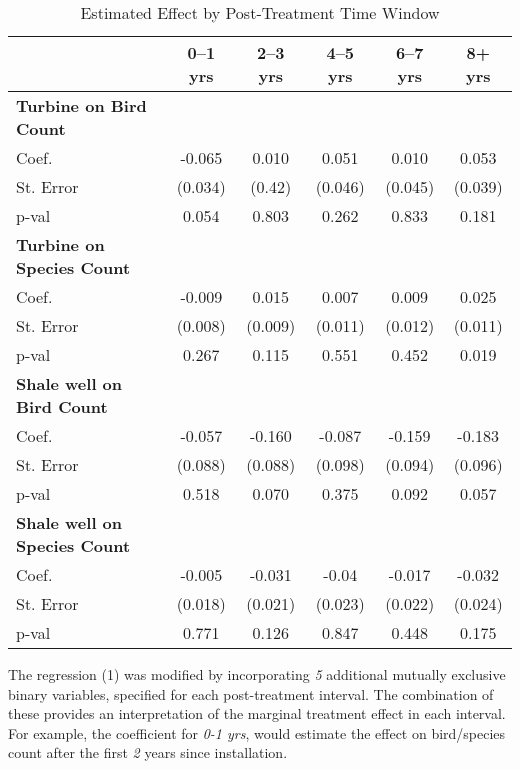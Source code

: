 \documentclass{article}
\begin{document}
\begin{table}[htbp]
\centering
\caption{Estimated Effect by Post-Treatment Time Window}
\label{tab:window_effects_shale_turbine}
\begin{tabular}{lccccc}
\toprule
 & 0--1 yrs & 2--3 yrs & 4--5 yrs & 6--7 yrs & 8+ yrs \\
\midrule
\textbf{Turbine on Bird Count} \\
Coef.      & -0.065 & 0.010  & 0.051  & 0.010  & 0.053 \\
St. Error  & (0.034) & (0.42) & (0.046) & (0.045) & (0.039) \\
p-val      & 0.054 & 0.803 & 0.262 & 0.833 & 0.181 \\
\midrule
\textbf{Turbine on Species Count} \\
Coef.      & -0.009 & 0.015  & 0.007  & 0.009 & 0.025 \\
St. Error  & (0.008) & (0.009) & (0.011) & (0.012) & (0.011) \\
p-val      & 0.267 & 0.115 & 0.551 & 0.452 & 0.019 \\
\midrule
\textbf{Shale well on Bird Count} \\
Coef.      & -0.057 & -0.160 & -0.087 & -0.159 & -0.183 \\
St. Error  & (0.088) & (0.088) & (0.098) & (0.094) & (0.096) \\
p-val      & 0.518 & 0.070 & 0.375 & 0.092 & 0.057 \\
\midrule
\textbf{Shale well on Species Count} \\
Coef.      & -0.005 & -0.031 & -0.04 & -0.017 & -0.032 \\
St. Error  & (0.018) & (0.021) & (0.023) & (0.022) & (0.024) \\
p-val      & 0.771 & 0.126 & 0.847 & 0.448 & 0.175 \\
\bottomrule
\end{tabular}
\vspace{1mm}
\begin{flushleft}
\footnotesize
\end{flushleft}
\end{table}

The regression (1) was modified by incorporating \textit{5} additional mutually exclusive binary variables, specified for each post-treatment interval. The combination of these provides an interpretation of the marginal treatment effect in each interval. For example, the coefficient for \textit{0-1 yrs}, would estimate the effect on bird/species count after the first \textit{2} years since installation.
\end{document}
